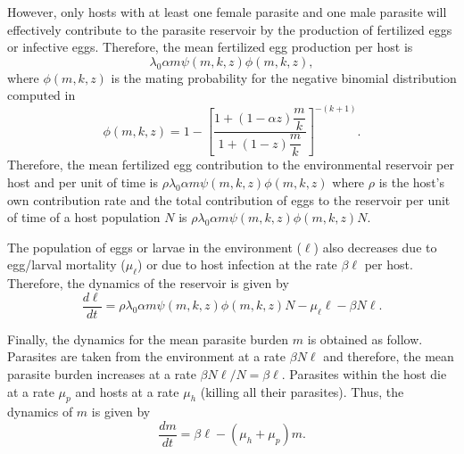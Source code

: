 \documentclass[eng]{MMSB-class-eng}
\begin{document}
However, only hosts with at least one female parasite and one male parasite will effectively contribute to the parasite reservoir by the production of fertilized eggs or infective eggs. 
Therefore, the mean fertilized egg production per host is
\begin{equation}\label{meanfertilizedeggs}
\lambda_0
\alpha m
\psi(m,k,z)\phi(m,k,z),
\end{equation} 
where $\phi(m,k,z)$ is the mating probability for the negative binomial distribution computed in \citet{lopez2022general}
\begin{equation}\label{phi}
\phi(m,k,z)=1-\left[ \frac{1+ \left( 1-
	\alpha z
	\right) \dfrac{m}{k}}{1+(1-z)\dfrac{m}{k}}\right] ^{-(k+1)}.
\end{equation}
Therefore, the mean fertilized egg contribution to the environmental reservoir  per host and per unit of time is
$\rho\lambda_0
\alpha m
\psi(m,k,z) \phi(m,k,z)$ where $\rho$ 
is the host's own contribution rate and the total contribution of eggs to the reservoir per unit of time of a host population $N$ is 
$\rho\lambda_0
\alpha m
\psi(m,k,z) \phi(m,k,z) N$. 

The population of eggs or larvae in the environment ($\ell$) also decreases due to egg/larval mortality ($\mu_{\ell}$) or due to host infection at the rate $\beta \ell$ per host. 
Therefore, the dynamics of the reservoir is given by
\begin{equation}\label{eqreservorio}
\dfrac{d\ell}{dt}= \rho\lambda_0
\alpha m
\psi(m,k,z) \phi(m,k,z) N- \mu_{\ell} \ell -\beta N \ell.
\end{equation}

Finally, the dynamics for the mean parasite burden $m$ is obtained as follow. Parasites are taken from the environment at a rate $\beta N \ell $ and therefore, the mean parasite burden increases at a rate $\beta  N\ell/N=\beta\ell $. Parasites within the host die at a rate $\mu_p$ and hosts at a rate $\mu_h$ (killing all their parasites). Thus, the dynamics of $m$ is given by
\begin{equation}\label{eqm}
\dfrac{dm}{dt}=\beta \ell - (\mu_h+\mu_p)m.
\end{equation}
\end{document}
